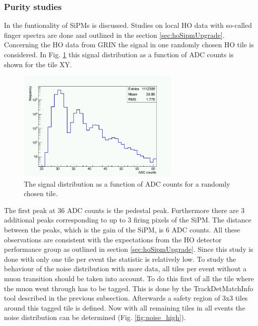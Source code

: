 		\subsubsection{Purity studies}
			In \cite{dn2014-020} the funtionality of SiPMs is discussed.
			Studies on local HO data with so-called finger spectra are done and outlined in the section \ref{sec:hoSipmUpgrade}.
			Concerning the HO data from GRIN the signal in one randomly chosen HO tile is considered.
			In Fig. \ref{fig:noise_low} this signal distribution as a function of ADC counts is shown for the tile XY.
			\begin{figure}[htbp]
				\centering
				\includegraphics[width=0.70\textwidth]{Figures/erdogan/noise_low.png}
				\caption{The signal distribution as a function of ADC counts for a randomly chosen tile.}
				\label{fig:noise_low}
			\end{figure}
			The first peak at 36 ADC counts is the pedestal peak.
			Furthermore there are 3 additional peaks corresponding to up to 3 firing pixels of the SiPM.
			The distance between the peaks, which is the gain of the SiPM, is 6 ADC counts.
			All these observations are consistent with the expectations from the HO detector performance group as outlined in section \ref{sec:hoSipmUpgrade}.
			Since this study is done with only one tile per event the statistic is relatively low.
			To study the behaviour of the noise distribution with more data, all tiles per event without a muon transition should be taken into account.
			To do this first of all the tile where the muon went through has to be tagged.
			This is done by the TrackDetMatchInfo tool described in the previous subsection.
			Afterwards a safety region of 3x3 tiles around this tagged tile is defined.
			Now with all remaining tiles in all events the noise distribution can be determined (Fig. \ref{fig:noise_high}).
